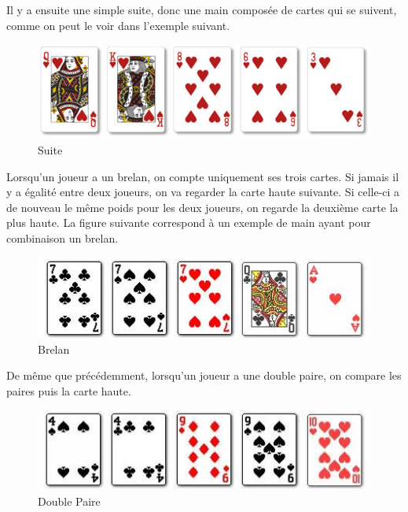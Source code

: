 \documentclass{report}
\begin{document}
\newpage
Il y a ensuite une simple suite, donc une main composée de cartes qui se suivent, comme on peut le voir dans l'exemple suivant.\par

		\begin{figure}[h]
			\begin{center}
				\includegraphics[scale=0.3]{./imagesRapport/suite.jpg}
			\end{center}
			\caption[Suite]{Suite}
		\end{figure}
		\medskip


Lorsqu'un joueur a un brelan, on compte uniquement ses trois cartes. Si jamais il y a égalité entre deux joueurs, on va regarder la carte haute suivante. Si celle-ci a de nouveau le même poids pour les deux joueurs, on regarde la deuxième carte la plus haute. La figure suivante correspond à un exemple de main ayant pour combinaison un brelan.\par
		\begin{figure}[h]
			\begin{center}
				\includegraphics[scale=0.4]{./imagesRapport/brelan.jpg}
			\end{center}
			\caption[Brelan]{Brelan}
		\end{figure}
		\medskip
De même que précédemment, lorsqu'un joueur a une double paire, on compare les paires puis la carte haute. 
		\begin{figure}[h]
			\begin{center}
				\includegraphics[scale=0.3]{./imagesRapport/doublePaire.jpg}
			\end{center}
			\caption[Double Paire]{Double Paire}
		\end{figure}
		\medskip
\end{document}
